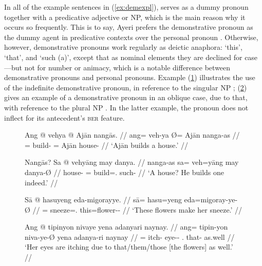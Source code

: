 
In all of the example sentences in (\ref{ex:demexpl}),
 serves as a dummy pronoun together with a
predicative adjective or NP, which is the main reason why it occurs so
frequently. This is to say, Ayeri prefers the demonstrative pronoun
 as the dummy agent in predicative contexts over the
personal pronoun . Otherwise, however, demonstrative
pronouns work regularly as deictic anaphora: `this', `that', and `such (a)',
except that as nominal elements they are declined for case---but not for number
or animacy, which is a notable difference between demonstrative pronouns and
personal pronouns. Example (\ref{ex:demproanaph1}) illustrates the use of the
indefinite demonstrative pronoun,  in reference to
the singular NP ; (\ref{ex:demproanaph2}) gives an
example of a demonstrative pronoun in an oblique case, 
{due to that}, with reference to the plural NP
. In the latter example, the
pronoun does not inflect for its antecedent's \textsc{\Num{}ber} feature.

\begin{figure}[h]
\pex\label{ex:demproanaph1}
\a\begingl
	\gla Ang @ vehya {} @ Ajān nangās. //
	\glb ang= veh-ya Ø= Ajān nanga-as //
	\glc \AgtT{}= build-\TsgM{} \Top{}= Ajān house-\Parg{} //
	\glft `Ajān builds a house.' //
\endgl

\a\begingl
	\gla Nangās? Sa @ vehyāng may danya. //
	\glb nanga-as sa= veh=yāng may danya-Ø //
	\glc house-\Parg{} \PatT{}= build=\TsgM{}.\Aarg{} \Aff{} such-\Top{} //
	\glft `A house? He builds one indeed.' //
\endgl

\xe
\end{figure}

\begin{figure}[h]
\pex\label{ex:demproanaph2}
\a\begingl
	\gla Sā @ hasuyeng eda-migorayye. //
	\glb sā= hasu=yeng eda=migoray-ye-Ø //
	\glc \CauT{}= sneeze=\TsgF{}.\Aarg{} this=flower-\Pl{}-\Top{} //
	\glft `These flowers make her sneeze.' //
\endgl

\a\begingl
	\gla Ang @ tipinyon nivaye yena adanyari naynay. //
	\glb ang= tipin-yon niva-ye-Ø yena adanya-ri naynay //
	\glc \AgtT{}= itch-\TplN{} eye-\Pl{}-\Top{} \TsgF{}.\Gen{} that-\Caus{} 
		as.well //
	\glft `Her eyes are itching due to that/them/those [the flowers] as 
		well.' //
\endgl
\xe
\end{figure}

